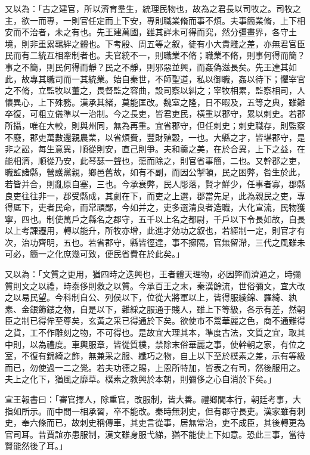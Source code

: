 \begin{pinyinscope}
又以為：「古之建官，所以濟育羣生，統理民物也，故為之君長以司牧之。司牧之主，欲一而專，一則官任定而上下安，專則職業脩而事不煩。夫事簡業脩，上下相安而不治者，未之有也。先王建萬國，雖其詳未可得而究，然分彊畫界，各守土境，則非重累羈絆之體也。下考殷、周五等之叙，徒有小大貴賤之差，亦無君官臣民而有二統互相牽制者也。夫官統不一，則職業不脩；職業不脩，則事何得而簡？事之不簡，則民何得而靜？民之不靜，則邪惡並興，而姦偽滋長矣。先王達其如此，故專其職司而一其統業。始自秦世，不師聖道，私以御職，姦以待下；懼宰官之不脩，立監牧以董之，畏督監之容曲，設司察以糾之；宰牧相累，監察相司，人懷異心，上下殊務。漢承其緒，莫能匡改。魏室之隆，日不暇及，五等之典，雖難卒復，可粗立儀準以一治制。今之長吏，皆君吏民，橫重以郡守，累以刺史。若郡所攝，唯在大較，則與州同，無為再重。宜省郡守，但任刺史；刺史職存，則監察不廢，郡吏萬數還親農業，以省煩費，豐財殖穀，一也。大縣之才，皆堪郡守，是非之訟，每生意異，順從則安，直己則爭。夫和羹之美，在於合異，上下之益，在能相濟，順從乃安，此琴瑟一聲也，蕩而除之，則官省事簡，二也。又幹郡之吏，職監諸縣，營護黨親，鄉邑舊故，如有不副，而因公掣頓，民之困弊，咎生於此，若皆并合，則亂原自塞，三也。今承衰弊，民人彫落，賢才鮮少，任事者寡，郡縣良吏往往非一，郡受縣成，其劇在下，而吏之上選，郡當先足，此為親民之吏，專得厎下，吏者民命，而常頑鄙，今如并之，吏多選清良者造職，大化宣流，民物獲寧，四也。制使萬戶之縣名之郡守，五千以上名之都尉，千戶以下令長如故，自長以上考課遷用，轉以能升，所牧亦增，此進才効功之叙也，若經制一定，則官才有次，治功齊明，五也。若省郡守，縣皆徑達，事不擁隔，官無留滯，三代之風雖未可必，簡一之化庶幾可致，便民省費在於此矣。」

又以為：「文質之更用，猶四時之迭興也，王者體天理物，必因弊而濟通之，時彌質則文之以禮，時泰侈則救之以質。今承百王之末，秦漢餘流，世俗彌文，宜大改之以易民望。今科制自公、列侯以下，位從大將軍以上，皆得服綾錦、羅綺、紈素、金銀飾鏤之物，自是以下，雜綵之服通于賤人，雖上下等級，各示有差，然朝臣之制已得侔至尊矣，玄黃之采已得通於下矣。欲使市不鬻華麗之色，商不通難得之貨，工不作雕刻之物，不可得也。是故宜大理其本，準度古法，文質之宜，取其中則，以為禮度。車輿服章，皆從質樸，禁除末俗華麗之事，使幹朝之家，有位之室，不復有錦綺之飾，無兼采之服、纖巧之物，自上以下至於樸素之差，示有等級而已，勿使過一二之覺。若夫功德之賜，上恩所特加，皆表之有司，然後服用之。夫上之化下，猶風之靡草。樸素之教興於本朝，則彌侈之心自消於下矣。」

宣王報書曰：「審官擇人，除重官，改服制，皆大善。禮鄉閭本行，朝廷考事，大指如所示。而中間一相承習，卒不能改。秦時無刺史，但有郡守長吏。漢家雖有刺史，奉六條而已，故刺史稱傳車，其吏言從事，居無常治，吏不成臣，其後轉更為官司耳。昔賈誼亦患服制，漢文雖身服弋綈，猶不能使上下如意。恐此三事，當待賢能然後了耳。」


\end{pinyinscope}
